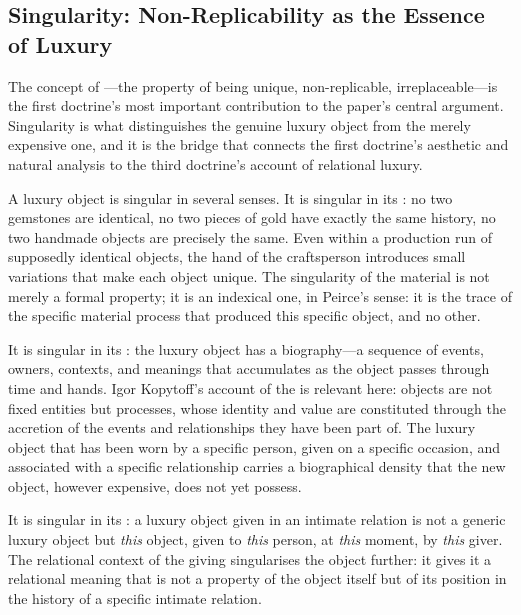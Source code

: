 \subsection{Singularity: Non-Replicability as the Essence of Luxury}
\label{p16:subsec:singularity}

\noindent
The concept of ---the property of being unique, non-replicable, irreplaceable---is the first doctrine's most important contribution to the paper's central argument. Singularity is what distinguishes the genuine luxury object from the merely expensive one, and it is the bridge that connects the first doctrine's aesthetic and natural analysis to the third doctrine's account of relational luxury.

A luxury object is singular in several senses. It is singular in its : no two gemstones are identical, no two pieces of gold have exactly the same history, no two handmade objects are precisely the same. Even within a production run of supposedly identical objects, the hand of the craftsperson introduces small variations that make each object unique. The singularity of the material is not merely a formal property; it is an indexical one, in Peirce's sense: it is the trace of the specific material process that produced this specific object, and no other.

It is singular in its : the luxury object has a biography---a sequence of events, owners, contexts, and meanings that accumulates as the object passes through time and hands. Igor Kopytoff's account of the  \parencite{kopytoff1986} is relevant here: objects are not fixed entities but processes, whose identity and value are constituted through the accretion of the events and relationships they have been part of. The luxury object that has been worn by a specific person, given on a specific occasion, and associated with a specific relationship carries a biographical density that the new object, however expensive, does not yet possess.

It is singular in its : a luxury object given in an intimate relation is not a generic luxury object but \emph{this} object, given to \emph{this} person, at \emph{this} moment, by \emph{this} giver. The relational context of the giving singularises the object further: it gives it a relational meaning that is not a property of the object itself but of its position in the history of a specific intimate relation.

